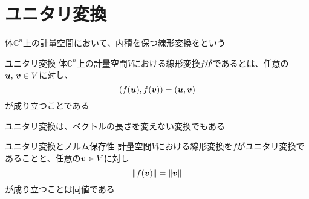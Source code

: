 \documentclass[../../../topic_linear-algebra]{subfiles}
\begin{document}
\sectionline
\section{ユニタリ変換}

体$\mathbb{C}^n$上の計量空間において、内積を保つ線形変換をという

\begin{definition}{ユニタリ変換}
  体$\mathbb{C}^n$上の計量空間$V$における線形変換$f$がであるとは、任意の$\vb*{u},\,\vb*{v} \in V$に対し、
  \begin{equation*}
    (f(\vb*{u}),f(\vb*{v})) = (\vb*{u},\vb*{v})
  \end{equation*}
  が成り立つことである
\end{definition}

ユニタリ変換は、ベクトルの長さを変えない変換でもある

\begin{theorem}{ユニタリ変換とノルム保存性}
  計量空間$V$における線形変換を$f$がユニタリ変換であることと、任意の$\vb*{v} \in V$に対し
  \begin{equation*}
    \|f(\vb*{v})\| = \|\vb*{v}\|
  \end{equation*}
  が成り立つことは同値である
\end{theorem}
\end{document}
